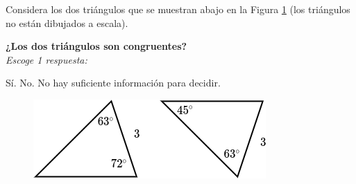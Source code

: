 Considera los dos triángulos que se muestran abajo en la Figura \ref{fig:20230323155215} (los triángulos no están dibujados a escala).

\begin{minipage}{0.6\textwidth}
    \textbf{¿Los dos triángulos son congruentes?}\\
    \emph{Escoge 1 respuesta:}\\

    \begin{choices}
        \CorrectChoice Sí.
        \choice No.
        \choice No hay suficiente información para decidir.
    \end{choices}

\end{minipage}%
\begin{minipage}{0.35\textwidth}
    \begin{figure}[H]
        \centering
        \includegraphics[width=\linewidth]{../images/20230323155215}
        \caption{}
        \label{fig:20230323155215}
    \end{figure}
\end{minipage}

